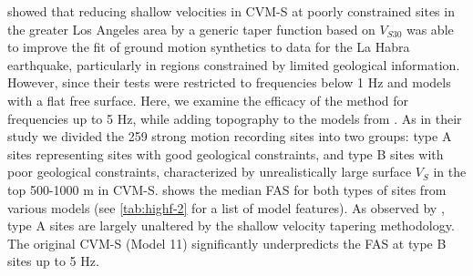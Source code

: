 
\citet{huCalibrationNearsurfaceSeismic2021} showed that reducing shallow velocities in CVM-S at poorly constrained sites in the greater Los Angeles area by a generic taper function based on $V_{S30}$ was able to improve the fit of ground motion synthetics to data for the La Habra earthquake, particularly in regions constrained by limited geological information.
However, since their tests were restricted to frequencies below 1 Hz and models with a flat free surface. Here, we examine the efficacy of the method for frequencies up to 5 Hz, while adding topography to the models from \citet{huCalibrationNearsurfaceSeismic2021}.
As in their study we divided the 259 strong motion recording sites into two groups: type A sites representing sites with good geological constraints, and type B sites with poor geological constraints, characterized by unrealistically large surface $V_S$ in the top 500-1000 m in CVM-S.  shows the median FAS for both types of sites from various models (see \cref{tab:highf-2} for a list of model features). As observed by \citet{huCalibrationNearsurfaceSeismic2021}, type A sites are largely unaltered by the shallow velocity tapering methodology. The original CVM-S (Model 11) significantly underpredicts the FAS at type B sites up to 5 Hz. 

